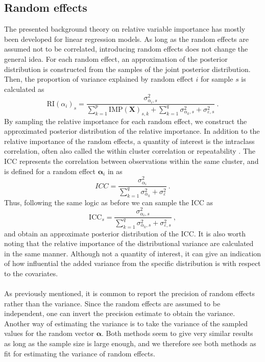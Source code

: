 \subsection{Random effects}
The presented background theory on relative variable importance has mostly been developed for linear regression models. As long as the random effects are assumed not to be correlated, introducing random effects does not change the general idea. For each random effect, an approximation of the posterior distribution is constructed from the samples of the joint posterior distribution. Then, the proportion of variance explained by random effect $i$ for sample $s$ is calculated as 
\begin{equation}
    \label{eq:RI_alpha}
    \text{RI}(\alpha_i)_{s} = \frac{\sigma_{\alpha_i, s}^2}{\sum_{k=1}^{p}\text{IMP}(\mathbf{X})_{s, k} + \sum_{k=1}^q \sigma_{\alpha_k, s}^2 + \sigma_{\varepsilon, s}^2} \ .
\end{equation}
By sampling the relative importance for each random effect, we construct the approximated posterior distribution of the relative importance.
In addition to the relative importance of the random effects, a quantity of interest is the intraclass correlation, often also called the within cluster correlation or repeatability \citep{GLMM_book}. The ICC represents the correlation between observations within the same cluster, and is defined for a random effect $\boldsymbol{\alpha}_i$ in \citep{nakagawa2017} as
\begin{equation}
    ICC = \frac{\sigma_{\alpha_i}^2}{\sum_{k=1}^{q}\sigma_{\alpha_k}^2 + \sigma_{\varepsilon}^2} \ .
\end{equation}
Thus, following the same logic as before we can sample the ICC as 
\begin{equation}
    \text{ICC}_s = \frac{\sigma_{\alpha_i, s}^2}{\sum_{k=1}^{q}\sigma_{\alpha_k, s}^2 + \sigma_{\varepsilon, s}^2} \ ,
\end{equation}
and obtain an approximate posterior distribution of the ICC. It is also worth noting that the relative importance of the distributional variance are calculated in the same manner. Although not a quantity of interest, it can give an indication of how influential the added variance from the specific distribution is with respect to the covariates.
\\
\\
As previously mentioned, it is common to report the precision of random effects rather than the variance. Since the random effects are assumed to be independent, one can invert the precision estimate to obtain the variance. Another way of estimating the variance is to take the variance of the sampled values for the random vector $\boldsymbol{\alpha}$. Both methods seem to give very similar results as long as the sample size is large enough, and we therefore see both methods as fit for estimating the variance of random effects.

